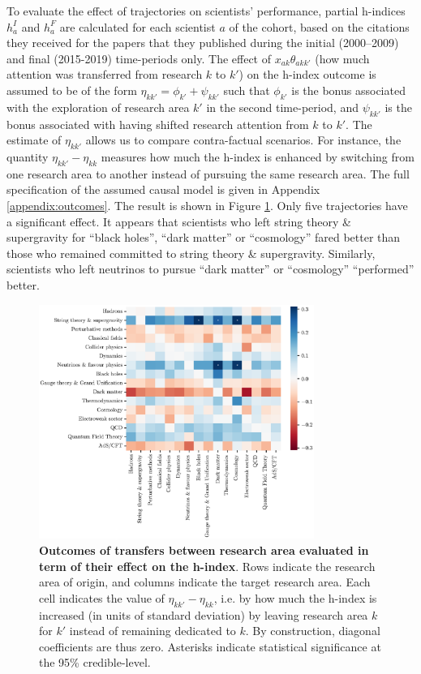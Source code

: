 \documentclass{article}
\begin{document}
To evaluate the effect of trajectories on scientists' performance, partial h-indices $h_a^{I}$ and $h_a^{F}$ are calculated for each scientist $a$ of the cohort, based on the citations they received for the papers that they published during the initial (2000--2009) and final (2015-2019) time-periods only. The effect of $x_{ak}\theta_{akk'}$ (how much attention was transferred from research $k$ to $k'$) on the h-index outcome is assumed to be of the form $\eta_{kk'} = \phi_{k'} + \psi_{kk'}$ such that $\phi_{k'}$ is the bonus associated with the exploration of research area $k'$ in the second time-period, and $\psi_{kk'}$ is the bonus associated with having shifted research attention from $k$ to $k'$. The estimate of $\eta_{kk'}$ allows us to compare contra-factual scenarios. For instance, the quantity $\eta_{kk'}-\eta_{kk}$ measures how much the h-index is enhanced by switching from one research area to another instead of pursuing the same research area. The full specification of the assumed causal model is given in Appendix \ref{appendix:outcomes}. The result is shown in Figure \ref{fig:outcomes_rho}. Only five trajectories have a significant effect. It appears that scientists who left string theory \& supergravity for ``black holes'', ``dark matter'' or ``cosmology'' fared better than those who remained committed to string theory \& supergravity. Similarly, scientists who left neutrinos to pursue ``dark matter'' or ``cosmology'' ``performed'' better.

\begin{figure}[h]
    \centering
    \includegraphics[width=0.8\textwidth]{plots/outcomes_rho.eps}
    \caption{\textbf{Outcomes of transfers between research area evaluated in term of their effect on the h-index}. Rows indicate the research area of origin, and columns indicate the target research area. Each cell indicates the value of $\eta_{kk'}-\eta_{kk}$, i.e. by how much the h-index is increased (in units of standard deviation) by leaving research area $k$ for $k'$ instead of remaining dedicated to $k$. By construction, diagonal coefficients are thus zero. Asterisks indicate statistical significance at the 95\% credible-level. }
    \label{fig:outcomes_rho}
\end{figure}
\end{document}

